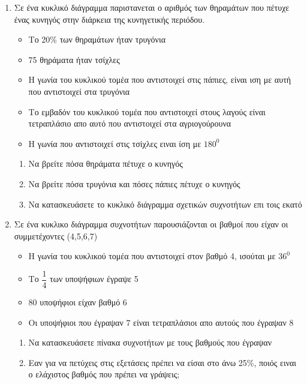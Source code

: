 \documentclass[a4paper,12pt]{article}                      %
\begin{document}
\begin{enumerate}
\item Σε ένα κυκλικό διάγραμμα παριστανεται ο αριθμός των θηραμάτων που πέτυχε ένας κυνηγός στην διάρκεια της κυνηγετικής περιόδου.
\begin{itemize}
\item Το 20\% των θηραμάτων ήταν τρυγόνια
\item 75 θηράματα ήταν τσίχλες
\item Η γωνία του κυκλικού τομέα που αντιστοιχεί στις πάπιες, είναι ιση με αυτή που αντιστοιχεί στα τρυγόνια
\item Το εμβαδόν του κυκλικού τομέα που αντιστοιχεί στους λαγούς είναι τετραπλάσιο απο αυτό που αντιστοιχεί στα αγριογούρουνα
\item Η γωνία που αντιστοιχεί στις τσίχλες ειναι ίση με $ 180^0 $
\end{itemize}
\begin{enumerate}
\item Να βρείτε πόσα θηράματα πέτυχε ο κυνηγός
\item Να βρείτε πόσα τρυγόνια και πόσες πάπιες πέτυχε ο κυνηγός
\item Να κατασκευάσετε το κυκλικό διάγραμμα σχετικών συχνοτήτων επι τοις εκατό
\end{enumerate}

\item Σε ένα κυκλικο διάγραμμα συχνοτήτων παρουσιάζονται οι βαθμοί που είχαν οι συμμετέχοντες (4,5,6,7)
\begin{itemize}
\item Η γωνία του κυκλικού τομέα που αντιστοιχεί στον βαθμό 4, ισούται με $ 36^0 $
\item Το $ \dfrac{1}{4} $ των υποψήφιων έγραψε 5
\item 80 υποψήφιοι είχαν βαθμό 6
\item Οι υποψήφιοι που έγραψαν 7 είναι τετραπλάσιοι απο αυτούς που έγραψαν 8
\end{itemize}
\begin{enumerate}
\item Να κατασκευάσετε πίνακα συχνοτήτων με τους βαθμούς που έγραψαν
\item Eαν για να πετύχεις στις εξετάσεις πρέπει να είσαι στο άνω 25\%, ποιός ειναι ο ελάχιστος βαθμός που πρέπει να γράψεις;
\end{enumerate}
\end{enumerate}
\end{document}
